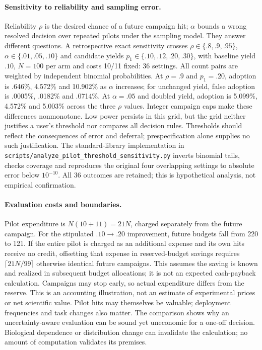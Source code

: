 \paragraph{Sensitivity to reliability and sampling error.}
\label{app:threshold_sensitivity}
Reliability $\rho$ is the desired chance of a future campaign hit; $\alpha$ bounds a wrong resolved decision over repeated pilots under the sampling model. They answer different questions. A retrospective exact sensitivity crosses $\rho\in\{.8,.9,.95\}$, $\alpha\in\{.01,.05,.10\}$ and candidate yields $p_1\in\{.10,.12,.20,.30\}$, with baseline yield $.10$, $N=100$ per arm and costs 10/11 fixed: 36 settings. All count pairs are weighted by independent binomial probabilities. At $\rho=.9$ and $p_1=.20$, adoption is .646\%, 4.572\% and 10.902\% as $\alpha$ increases; for unchanged yield, false adoption is .0005\%, .0182\% and .0714\%. At $\alpha=.05$ and doubled yield, adoption is 5.099\%, 4.572\% and 5.003\% across the three $\rho$ values. Integer campaign caps make these differences nonmonotone. Low power persists in this grid, but the grid neither justifies a user's threshold nor compares all decision rules. Thresholds should reflect the consequences of error and deferral; prespecification alone supplies no such justification. The standard-library implementation in \texttt{scripts/analyze\_pilot\_threshold\_sensitivity.py} inverts binomial tails, checks coverage and reproduces the original four overlapping settings to absolute error below $10^{-10}$. All 36 outcomes are retained; this is hypothetical analysis, not empirical confirmation.

\paragraph{Evaluation costs and boundaries.}
Pilot expenditure is $N(10+11)=21N$, charged separately from the future campaign. For the stipulated $.10\to.20$ improvement, future budgets fall from 220 to 121. If the entire pilot is charged as an additional expense and its own hits receive no credit, offsetting that expense in reserved-budget savings requires $\lceil21N/99\rceil$ otherwise identical future campaigns. This assumes the saving is known and realized in subsequent budget allocations; it is not an expected cash-payback calculation. Campaigns may stop early, so actual expenditure differs from the reserve. This is an accounting illustration, not an estimate of experimental prices or net scientific value. Pilot hits may themselves be valuable; deployment frequencies and task changes also matter. The comparison shows why an uncertainty-aware evaluation can be sound yet uneconomic for a one-off decision. Biological dependence or distribution change can invalidate the calculation; no amount of computation validates its premises.

